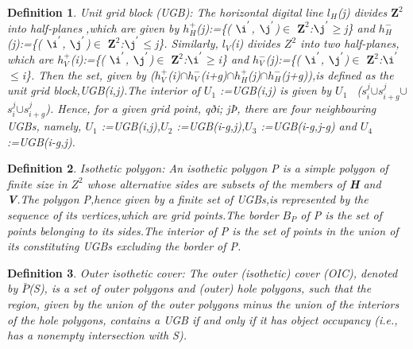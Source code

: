 \documentclass[12pt]{article}
\newtheorem{DEF}{Definition}
\begin{document}
\begin{DEF}
\textnormal{Unit grid block (UGB)}: The horizontal digital line ${\textit{l}}_H$(\textit{j}) divides $\textbf{Z}^2$ into half-planes ,which are given by  \textit{$h_H^{+}$}(\textit{j}):=\{(\textit{ $\i^{'}$},\textit{ $\j^{'}$})$\in$ $\textbf{Z}^2$:\textit{$\j^{'}$}$\geq$\textit{j}\} and  \textit{$h_H^{-}$}(\textit{j}):=\{(\textit{ $\i^{'}$},\textit{ $\j^{'}$})$\in$ $\textbf{Z}^2$:\textit{$\j^{'}$}$\leq$\textit{j}\}. Similarly, ${\textit{l}}_V$(\textit{i}) divides \textbf{$Z^{2}$} into two half-planes, which are \textit{$h_V^{+}$}(\textit{i}):=\{(\textit{ $\i^{'}$},\textit{ $\j^{'}$})$\in$ $\textbf{Z}^2$:\textit{$\i^{'}$}$\geq$\textit{i}\} and  \textit{$h_V^{-}$}(\textit{j}):=\{(\textit{ $\i^{'}$},\textit{ $\j^{'}$})$\in$ $\textbf{Z}^2$:\textit{$\i^{'}$}$\leq$\textit{i}\}. Then the set, given by (\textit{$h_V^{+}$}(\textit{i})$\cap$\textit{$h_V^{-}$}(\textit{i}+\textit{g})$\cap$\textit{$h_H^{+}$}(\textit{j})$\cap$\textit{$h_H^{-}$}(\textit{j}+\textit{g})),is defined as the unit grid block,UGB(\textit{i},\textit{j}).The interior of \textit{$U_{1}$} :=UGB(\textit{i},\textit{j}) is given by \textit{$U_{1}$} \ (\textit{$s_{i}^{j}$}$\cup$\textit{$s_{i+g}^{j}$}$\cup$ \textit{$s_{i}^{j}$}$\cup$\textit{$s_{i+g}^{j}$}). Hence, for a given grid point, qði; jÞ, there are four neighbouring UGBs, namely, \textit{$U_{1}$} :=UGB(\textit{i},\textit{j}),\textit{$U_{2}$} :=UGB(\textit{i-g},\textit{j}),\textit{$U_{3}$} :=UGB(\textit{i-g},\textit{j-g}) and \textit{$U_{4}$} :=UGB(\textit{i-g},\textit{j}).
\end{DEF}
 

\begin{DEF}
\textnormal{Isothetic polygon}: An isothetic polygon \textit{P} is a simple polygon of finite size in \textbf{$Z^{2}$} whose alternative sides are subsets of the members of \textbf{H} and \textbf{V}.The polygon \textit{P},hence given by a finite set of UGBs,is represented by the sequence of its vertices,which are grid points.The border \textit{$B_{P}$} of \textit{P} is the set of points belonging to its sides.The interior of \textit{P} is the set of points in the union of its constituting UGBs excluding the border of P.
\end{DEF}


\begin{DEF}
\textnormal{Outer isothetic cover}: The outer (isothetic) cover (OIC), denoted by $\bar{P}$(\textit{S}), is a set of outer polygons and (outer) hole polygons, such that the region, given by the union of the outer polygons minus the union of the interiors of the hole polygons, contains a UGB if and only if it has object occupancy (i.e., has a nonempty intersection with S).
\end{DEF}
\end{document}
